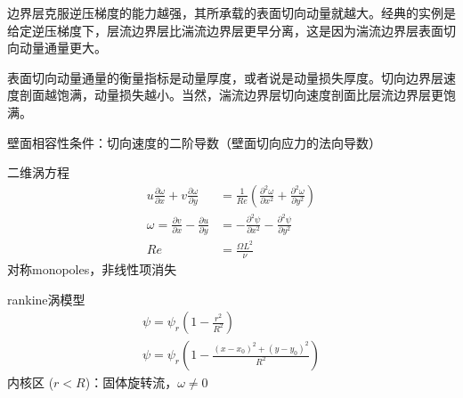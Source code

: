 边界层克服逆压梯度的能力越强，其所承载的表面切向动量就越大。经典的实例是给定逆压梯度下，层流边界层比湍流边界层更早分离，这是因为湍流边界层表面切向动量通量更大。

表面切向动量通量的衡量指标是动量厚度，或者说是动量损失厚度。切向边界层速度剖面越饱满，动量损失越小。当然，湍流边界层切向速度剖面比层流边界层更饱满。

壁面相容性条件：切向速度的二阶导数（壁面切向应力的法向导数） 

二维涡方程
\begin{align}
    u\frac{\partial \omega}{\partial x}+v\frac{\partial \omega}{\partial y}&=\frac{1}{Re}\left(\frac{\partial^{2} \omega}{\partial x^{2}}+\frac{\partial^{2} \omega}{\partial y^{2}}\right)\\
    \omega = \frac{\partial v}{\partial x}-\frac{\partial u}{\partial y}&=-\frac{\partial^{2} \psi}{\partial x^{2}}-\frac{\partial^{2} \psi}{\partial y^{2}}\\
    Re&=\frac{\Omega L^{2}}{\nu}
\end{align}
对称monopoles，非线性项消失

rankine涡模型
\begin{align}
    \psi = \psi_{r}\left(1-\frac{r^{2}}{R^{2}}\right)\\
    \psi = \psi_{r}\left(1-\frac{(x-x_{0})^{2}+(y-y_{0})^{2}}{R^{2}}\right)
\end{align}
内核区 ($r<R$)：固体旋转流，$\omega \neq 0$